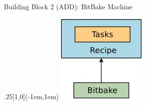 \documentclass[ucs,9pt]{beamer}
\begin{document}
\begin{frame}[fragile]
    {Building Block 2 (ADD): BitBake Machine}

    \begin{textblock*}{.25\paperwidth}[1,0](\paperwidth-1em,1em)%
        \includegraphics[width=\linewidth]{images/bitbake-definition}
    \end{textblock*}%


\end{frame}
\end{document}
